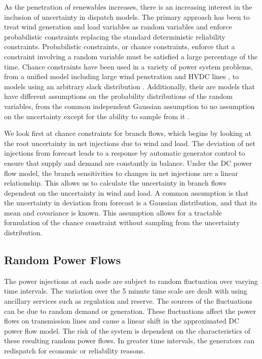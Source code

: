 As the penetration of renewables increases, there is an increasing interest in the inclusion of uncertainty in dispatch models.  The primary approach has been to treat wind generation and load variables as random variables and enforce probabilistic constraints replacing the standard deterministic reliability constraints.  Probabilistic constraints, or chance constraints, enforce that a constraint involving a random variable must be satisfied a large percentage of the time.  Chance constraints have been used in a variety of power system problems, from a unified model including large wind penetration and HVDC lines \cite{vrakopoulou_2013c}, to models using an arbitrary slack distribution \cite{bienstock_2012}.  Additionally, their are models that have different assumptions on the probability distributions of the random variables, from the common independent Gaussian assumption \cite{bienstock_2012,roald_2013} to no assumption on the uncertainty except for the ability to sample from it \cite{vrakopoulou_2013,vrakopoulou_2013c,vrakopoulou_2013b}.



We look first at chance constraints for branch flows, which begins by looking at the root uncertainty in net injections due to wind and load. The deviation of net injections from forecast leads to a response by automatic generator control to ensure that supply and demand are constantly in balance.  Under the DC power flow model, the branch sensitivities to changes in net injections are a linear relationship.  This allows us to calculate the uncertainty in branch flows dependent on the uncertainty in wind and load.  A common assumption is that the uncertainty in deviation from forecast is a Gaussian distribution,  and that its mean and covariance is known.  This assumption allows for a tractable formulation of the chance constraint without sampling from the uncertainty distribution. 

\subsection{Random Power Flows}
The power injections at each node are subject to random fluctuation over varying time intervals.  The variation over the 5 minute time scale are dealt with using ancillary services such as regulation and reserve.  The sources of the fluctuations can be due to random demand or generation.  These fluctuations affect the power flows on transmission lines and cause a linear shift in the approximated DC power flow model.  The risk of the system is dependent on the characteristics of these resulting random power flows.  In greater time intervals, the generators can redispatch for economic or reliability reasons.


